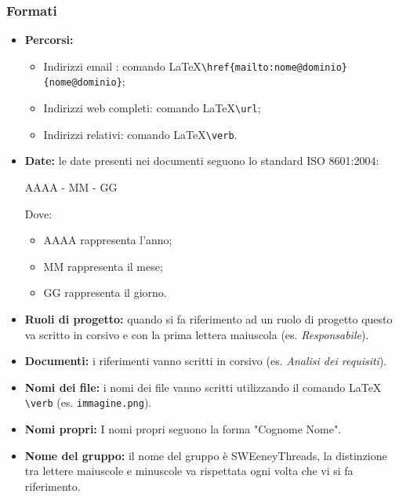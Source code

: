 \documentclass[a4paper]{article}
\begin{document}
		\subsubsection{Formati}
		\begin{itemize}
			\item \textbf{Percorsi:}
			\begin{itemize}
				\item Indirizzi email : comando \LaTeX \space \verb|\href{mailto:nome@dominio}{nome@dominio}|;
				\item Indirizzi web completi: comando \LaTeX \space \verb|\url|;
				\item Indirizzi relativi: comando \LaTeX  \space \verb|\verb|.
			\end{itemize}
			\item \textbf{Date:} le date presenti nei documenti seguono lo standard ISO 8601:2004:
			\begin{center}
				AAAA - MM - GG
			\end{center}
			Dove:
			\begin{itemize}
				\item AAAA rappresenta l'anno;
				\item MM rappresenta il mese;
				\item GG rappresenta il giorno.
			\end{itemize}
			\item \textbf{Ruoli di progetto:} quando si fa riferimento ad un ruolo di progetto questo va scritto in corsivo
			e con la prima lettera maiuscola (es. \textit{Responsabile}).
			\item \textbf{Documenti:} i riferimenti vanno scritti in corsivo (es. \textit{Analisi dei requisiti}).
			\item \textbf{Nomi dei file:} i nomi dei file vanno scritti utilizzando il comando \LaTeX \space
			\verb|\verb| (es. \verb|immagine.png|).
			\item \textbf{Nomi propri:} I nomi propri seguono la forma "Cognome Nome".
			\item \textbf{Nome del gruppo:} il nome del gruppo è SWEeneyThreads, la distinzione tra lettere maiuscole e
			minuscole va rispettata ogni volta che vi si fa riferimento.
		\end{itemize}
\end{document}
